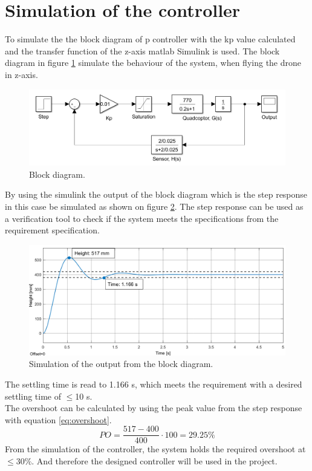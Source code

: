 \section{Simulation of the controller}
 To simulate the the block diagram of p controller with the kp value calculated and the transfer function of the z-axis matlab Simulink is used. The block diagram in figure \ref{fig:Mat_Lab} simulate the behaviour of the system, when flying the drone in z-axis. 
 \begin{figure}[H]
     \centering
     \includegraphics[width=\textwidth]{figures/ch_movement/matlab_block.png}
     \caption{Block diagram.}
     \label{fig:Mat_Lab}
 \end{figure}
By using the simulink the output of the block diagram which is the step response in this case be simulated as shown on figure \ref{fig:simu}. The step response can be used as a verification tool to check if the system meets the specifications from the requirement specification. 
\begin{figure}[H]
    \centering
    \includegraphics[width=1\textwidth]{figures/ch_movement/Simu.png}
    \caption{Simulation of the output from the block diagram.}
    \label{fig:simu}
\end{figure}%
The settling time is read to 1.166 s, which meets the requirement with a desired settling time of $\leq$10 s.\\
The overshoot can be calculated by using the peak value from the step response with equation \ref{eq:overshoot}.
\begin{equation}\label{eq:overshoot}
   PO=\frac{517-400}{400}\cdot 100 = 29.25\%
\end{equation}
From the simulation of the controller, the system holds the required overshoot at $\leq$30\%. And therefore the designed controller will be used in the project.
